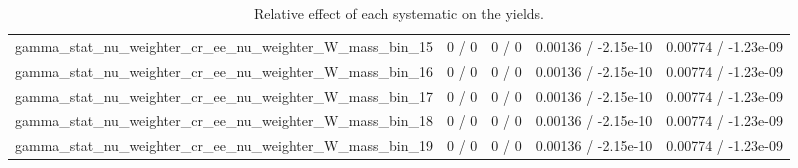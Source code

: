 \documentclass[10pt]{article}
\begin{document}
\begin{table}[htbp]
\begin{center}
\begin{tabular}{|c|c|c|c|c|}
  gamma_stat_nu_weighter_cr_ee_nu_weighter_W_mass_bin_15 & 0 / 0 & 0 / 0 & 0.00136 / -2.15e-10 & 0.00774 / -1.23e-09 \\ 
  gamma_stat_nu_weighter_cr_ee_nu_weighter_W_mass_bin_16 & 0 / 0 & 0 / 0 & 0.00136 / -2.15e-10 & 0.00774 / -1.23e-09 \\ 
  gamma_stat_nu_weighter_cr_ee_nu_weighter_W_mass_bin_17 & 0 / 0 & 0 / 0 & 0.00136 / -2.15e-10 & 0.00774 / -1.23e-09 \\ 
  gamma_stat_nu_weighter_cr_ee_nu_weighter_W_mass_bin_18 & 0 / 0 & 0 / 0 & 0.00136 / -2.15e-10 & 0.00774 / -1.23e-09 \\ 
  gamma_stat_nu_weighter_cr_ee_nu_weighter_W_mass_bin_19 & 0 / 0 & 0 / 0 & 0.00136 / -2.15e-10 & 0.00774 / -1.23e-09 \\ 
\hline 
\end{tabular} 
\caption{Relative effect of each systematic on the yields.} 
\end{center} 
\end{table} 
\end{document}
